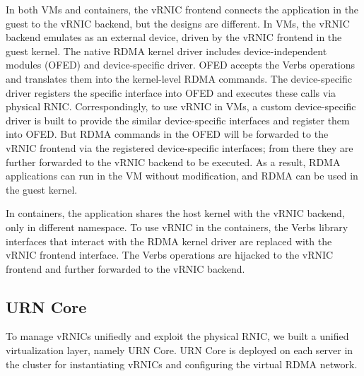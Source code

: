 In both VMs and containers, the vRNIC frontend connects the application in the guest to the vRNIC backend, but the designs are different. In VMs, the vRNIC backend emulates as an external device, driven by the vRNIC frontend in the guest kernel. The native RDMA kernel driver includes device-independent modules (OFED) and device-specific driver. OFED accepts the Verbs operations and translates them into the kernel-level RDMA commands. The device-specific driver registers the specific interface into OFED and executes these calls via physical RNIC. Correspondingly, to use vRNIC in VMs, a custom device-specific driver is built to provide the similar device-specific interfaces and register them into OFED. But RDMA commands in the OFED will be forwarded to the vRNIC frontend via the registered device-specific interfaces; from there
they are further forwarded to the vRNIC backend to be executed. As a result, RDMA applications can run in the VM without modification, and RDMA can be used in the guest kernel. 

In containers, the application shares the host kernel with the vRNIC backend, only in different namespace. To use vRNIC in the containers, the Verbs library interfaces that interact with the RDMA kernel driver are replaced with the vRNIC frontend interface. The Verbs operations are hijacked to the vRNIC frontend and further forwarded to the vRNIC backend.

\subsection{URN Core}

To manage vRNICs unifiedly and exploit the physical RNIC, we built a unified virtualization layer, namely URN Core. URN Core is deployed on each server in the cluster for instantiating vRNICs and configuring the virtual RDMA network.


